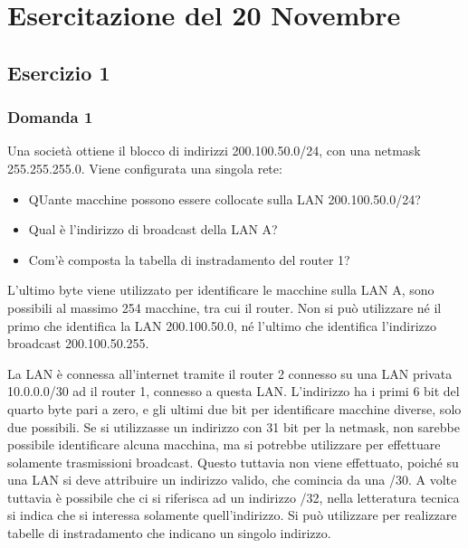 \documentclass{article}
\numberwithin{equation}{subsection}
\begin{document}

\clearpage

\section{Esercitazione del 20 Novembre}

\subsection*{Esercizio 1}
\subsubsection*{Domanda 1}

Una società ottiene il blocco di indirizzi 200.100.50.0/24, con una netmask 255.255.255.0. Viene configurata una singola rete:



\begin{itemize}
    \item QUante macchine possono essere collocate sulla LAN 200.100.50.0/24?
    \item Qual è l'indirizzo di broadcast della LAN A?
    \item Com'è composta la tabella di instradamento del router 1?
\end{itemize}

L'ultimo byte viene utilizzato per identificare le macchine sulla LAN A, sono possibili al massimo 254 macchine, tra cui il router. Non si può 
utilizzare né il primo che identifica la LAN 200.100.50.0, né l'ultimo che identifica l'indirizzo broadcast 200.100.50.255. 

La LAN è connessa all'internet tramite il router 2 connesso su una LAN privata 10.0.0.0/30 ad il router 1, connesso a questa LAN. 
L'indirizzo ha i primi 6 bit del quarto byte pari a zero, e gli ultimi due bit per identificare macchine diverse, solo due possibili. 
Se si utilizzasse un indirizzo con 31 bit per la netmask, non sarebbe possibile identificare alcuna macchina, ma si potrebbe utilizzare per 
effettuare solamente trasmissioni broadcast. Questo tuttavia non viene effettuato, poiché su una LAN si deve attribuire un indirizzo valido, 
che comincia da una /30. A volte tuttavia è possibile che ci si riferisca ad un indirizzo /32, nella letteratura tecnica si indica che si 
interessa solamente quell'indirizzo. Si può utilizzare per realizzare tabelle di instradamento che indicano un singolo indirizzo. 
\end{document}
